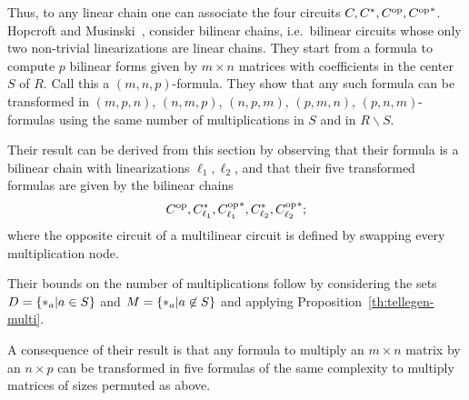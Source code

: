   Thus, to any
linear chain one can associate the four circuits
$C,C^\ast,C^{\mathrm{op}},{C^{\mathrm{op}}}^\ast$. Hopcroft and
Musinski~\cite{hopcroft+musinski73}, consider
bilinear chains, i.e.\ bilinear circuits whose
only two non-trivial linearizations are linear chains.  They start
from a formula to compute $p$ bilinear forms given by $m\times n$
matrices with coefficients in the center $S$ of $R$. Call this a
$(m,n,p)$-formula. They show that any such formula can be transformed
in $(m,p,n)$, $(n,m,p)$, $(n,p,m)$, $(p,m,n)$, $(p,n,m)$-formulas
using the same number of multiplications in $S$ and in $R\backslash
S$.

Their result can be derived from this section by observing that their
formula is a bilinear chain with linearizations $\ell_1,\ell_2$, and
that their five transformed formulas are given by the bilinear chains
\[C^{\mathrm{op}},C_{\ell_1}^\ast,{C_{\ell_1}^{\mathrm{op}}}^\ast,C_{\ell_2}^\ast,{C_{\ell_2}^{\mathrm{op}}}^\ast\text{;}\]
where the opposite circuit of a multilinear circuit is defined by
swapping every multiplication node. 

Their bounds on the number of multiplications follow by considering
the sets $D=\{*_{a}|a\in S\}$ and $M=\{*_{a}|a\not\in S\}$ and
applying Proposition~\ref{th:tellegen-multi}.

A consequence of their result is that any formula to multiply an
$m\times n$ matrix by an $n\times p$ can be transformed in five
formulas of the same complexity to multiply matrices of sizes permuted
as above.



%
